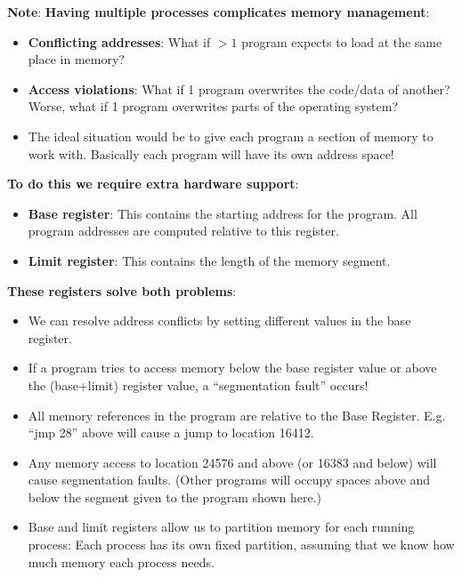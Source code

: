 \documentclass[11pt,a4paper]{article}
\theoremstyle{definition}
\newenvironment{myitemize}
{ \begin{itemize}
    \setlength{\itemsep}{5pt}
    \setlength{\parskip}{0pt}
    \setlength{\parsep}{0pt}     }
{ \end{itemize}                  }
\begin{document}
\noindent \textbf{Note}: \textbf{Having multiple processes complicates memory management}:
\begin{myitemize}
	\item \textbf{Conflicting addresses}: What if $>1$ program expects to load at the same place in memory?
	\item \textbf{Access violations}: What if 1 program overwrites the code/data of another? Worse, what if 1 program overwrites parts of the operating system?
	\item The ideal situation would be to give each program a section of memory to work with. Basically each program will have its own address space!
\end{myitemize}
\textbf{To do this we require extra hardware support}:
\begin{myitemize}
	\item \textbf{Base register}: This contains the starting address for the program. All program addresses are computed relative to this register.
	\item \textbf{Limit register}: This contains the length of the memory segment.
\end{myitemize}
\textbf{These registers solve both problems}:
\begin{myitemize}
	\item We can resolve address conflicts by setting different values in the base register.
	\item If a program tries to access memory below the base register value or above the (base+limit) register value, a ``segmentation fault'' occurs!
	\item All memory references in the program are relative to the Base Register. E.g. ``jmp 28'' above will cause a jump to location 16412.
	\item Any memory access to location 24576 and above (or 16383 and below) will cause segmentation faults. (Other programs will occupy spaces above and below the segment given to the program shown here.)
	\item Base and limit registers allow us to partition memory for each running process: Each process has its own fixed partition, assuming that we know how much memory each process needs.

\end{myitemize}
\end{document}
